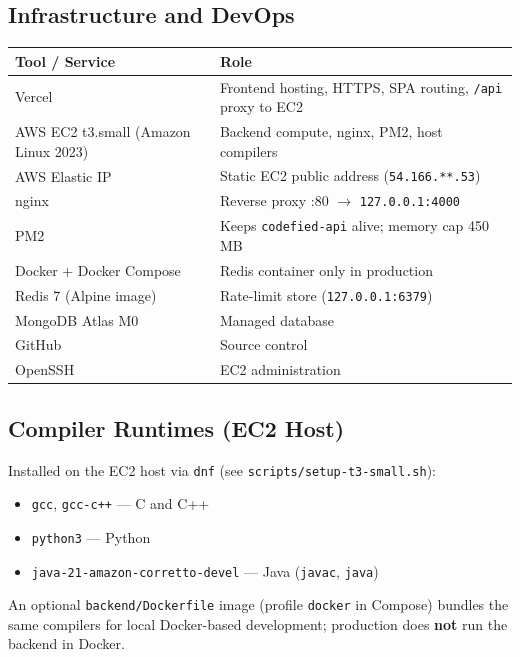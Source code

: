 \documentclass[11pt,a4paper]{article}
\newcommand{\maskedecip}{\texttt{54.166.**.53}}
\begin{document}
\subsection{Infrastructure and DevOps}
\begin{table}[h]
\centering
\small
\begin{tabular}{@{}ll@{}}
\toprule
\textbf{Tool / Service} & \textbf{Role} \\
\midrule
Vercel                  & Frontend hosting, HTTPS, SPA routing, \texttt{/api} proxy to EC2 \\
AWS EC2 t3.small (Amazon Linux 2023) & Backend compute, nginx, PM2, host compilers \\
AWS Elastic IP          & Static EC2 public address (\maskedecip) \\
nginx                   & Reverse proxy :80 $\rightarrow$ \texttt{127.0.0.1:4000} \\
PM2                     & Keeps \texttt{codefied-api} alive; memory cap 450\,MB \\
Docker + Docker Compose & Redis container only in production \\
Redis 7 (Alpine image)  & Rate-limit store (\texttt{127.0.0.1:6379}) \\
MongoDB Atlas M0        & Managed database \\
GitHub                  & Source control \\
OpenSSH                 & EC2 administration \\
\bottomrule
\end{tabular}
\end{table}

\subsection{Compiler Runtimes (EC2 Host)}
Installed on the EC2 host via \texttt{dnf} (see \texttt{scripts/setup-t3-small.sh}):
\begin{itemize}[noitemsep]
  \item \texttt{gcc}, \texttt{gcc-c++} --- C and C++
  \item \texttt{python3} --- Python
  \item \texttt{java-21-amazon-corretto-devel} --- Java (\texttt{javac}, \texttt{java})
\end{itemize}

An optional \texttt{backend/Dockerfile} image (profile \texttt{docker} in Compose) bundles the same compilers for local Docker-based development; production does \textbf{not} run the backend in Docker.
\end{document}
